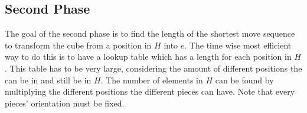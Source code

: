 \subsection{Second Phase}
\label{sub:secondPhase}
The goal of the second phase is to find the length of the shortest move sequence to transform the cube from a position in $H$ into $e$. The time wise most efficient way to do this is to have a lookup table which has a length for each position in $H$. This table has to be very large, considering the amount of different positions the \rubik{} can be in and still be in $H$. The number of elements in $H$ can be found by multiplying the different positions the different pieces can have. Note that every pieces' orientation must be fixed.


